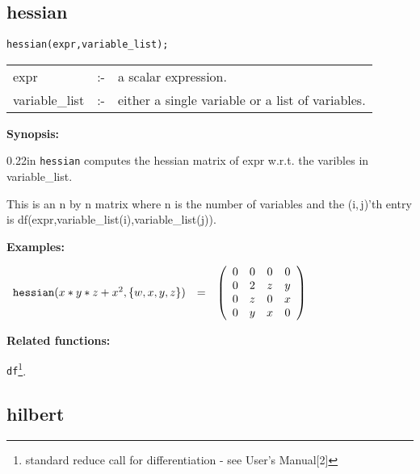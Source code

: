 \subsection{hessian}


\hspace*{0.175in} {\tt hessian(expr,variable\_list);}

\hspace*{0.1in} 
\begin{tabular}{l l l}
expr           &:-& a scalar expression. \\
variable\_list &:-& either a single variable or a list of variables.
\end{tabular}

{\bf Synopsis:} %

\begin{addtolength}{\leftskip}{0.22in}
                {\tt hessian} computes the hessian matrix of expr w.r.t.
                the varibles in variable\_list. 

This is an n by n matrix
                where n is the number of variables and the (i,$\,$j)'th 
                entry is df(expr,variable\_list(i),variable\_list(j)).

\end{addtolength}

{\bf Examples:}

\begin{flushleft}  
\hspace*{0.1in}
\begin{math}        
\begin{array}{ccc}
{\tt hessian}(x*y*z+x^2,\{w,x,y,z\}) & = & 
\left( \begin{array}{cccc} 0 & 0 & 0 & 0 \\ 0 & 2 & z & y \\ 0 & z & 0 
& x \\ 0 & y & x & 0
\end{array} \right)
\end{array}
\end{math}  
\end{flushleft}


{\bf Related functions:}

\hspace*{0.175in} {\tt df}\footnote{standard reduce call for 
differentiation - see {\REDUCE} User's Manual[2]}.


\subsection{hilbert}

